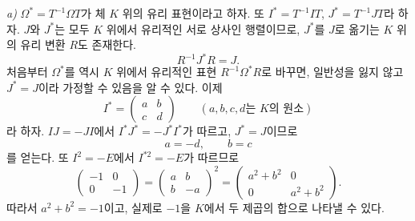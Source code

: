 \documentclass[11pt]{article}
\newcommand{\mat}[1]{\begin{pmatrix}#1\end{pmatrix}}
\begin{document}
\emph{a)} $\Omega^*=T^{-1}\Omega T$가 체 $K$ 위의 유리 표현이라고 하자. 또 $I^*=T^{-1}IT$, $J^*=T^{-1}JT$라 하자. $J$와 $J^*$는 모두 $K$ 위에서 유리적인 서로 상사인 행렬이므로, $J^*$를 $J$로 옮기는 $K$ 위의 유리 변환 $R$도 존재한다.
\[
        R^{-1}J^*R=J.
\]
처음부터 $\Omega^*$를 역시 $K$ 위에서 유리적인 표현 $R^{-1}\Omega^*R$로 바꾸면, 일반성을 잃지 않고 $J^*=J$이라 가정할 수 있음을 알 수 있다. 이제
\[
        I^*=\mat{a&b\\ c&d}\qquad (a,b,c,d\text{는 }K\text{의 원소})
\]
라 하자. $IJ=-JI$에서 $I^*J^*=-J^*I^*$가 따르고, $J^*=J$이므로
\[
        a=-d,
        \qquad b=c
\]
를 얻는다. 또 $I^2=-E$에서 $I^{*2}=-E$가 따르므로
\[
        \mat{-1&0\\0&-1}=\mat{a&b\\ b&-a}^2
        =\mat{a^2+b^2&0\\0&a^2+b^2}.
\]
따라서 $a^2+b^2=-1$이고, 실제로 $-1$을 $K$에서 두 제곱의 합으로 나타낼 수 있다.
\end{document}
